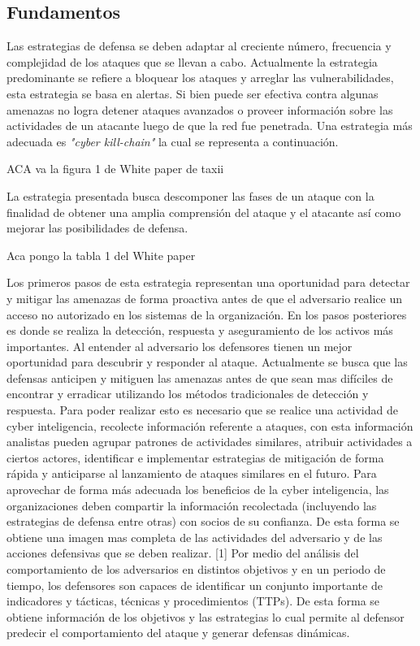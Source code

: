 \subsection{Fundamentos}
Las estrategias de defensa se deben adaptar al creciente número, frecuencia y 
complejidad de los ataques que se llevan a cabo. Actualmente la estrategia 
predominante se refiere a bloquear los ataques y arreglar las vulnerabilidades, 
esta estrategia se basa en alertas. Si bien puede ser efectiva contra algunas 
amenazas no logra detener ataques avanzados o proveer información sobre las 
actividades de un atacante luego de que la red fue penetrada. Una estrategia más 
adecuada es \emph{"cyber kill-chain"} la cual se representa a continuación.

ACA va la figura 1 de White paper de taxii

La estrategia presentada busca descomponer las fases de un ataque con la 
finalidad de obtener una amplia comprensión del ataque y el atacante así como 
mejorar las posibilidades de defensa.

Aca pongo la tabla 1 del White paper


Los primeros pasos de esta estrategia representan una oportunidad para detectar 
y mitigar las amenazas de forma proactiva antes de que el adversario realice un 
acceso no autorizado en los sistemas de la organización. En los pasos 
posteriores es donde se realiza la detección, respuesta y aseguramiento de los 
activos más importantes. Al entender al adversario los defensores tienen un 
mejor oportunidad para descubrir y responder al ataque. Actualmente se busca que 
las defensas anticipen y mitiguen las amenazas antes de que sean mas difíciles 
de encontrar y erradicar utilizando los métodos tradicionales de detección y 
respuesta.
Para poder realizar esto es necesario que se realice una actividad de cyber inteligencia,
recolecte información referente a ataques, con esta información analistas pueden 
agrupar patrones de actividades similares, atribuir actividades a ciertos actores, 
identificar e implementar estrategias de mitigación de forma rápida y anticiparse al 
lanzamiento de ataques similares en el futuro.
Para aprovechar de forma más adecuada los beneficios de la cyber inteligencia, 
las organizaciones deben compartir la información recolectada (incluyendo las 
estrategias de defensa entre otras) con socios de su confianza. De esta forma se 
obtiene una imagen mas completa de las actividades del adversario y de las 
acciones defensivas que se deben realizar. [1] Por medio del análisis del 
comportamiento de los adversarios en distintos objetivos y en un periodo de 
tiempo, los defensores son capaces de identificar un conjunto importante de 
indicadores y tácticas, técnicas y procedimientos (TTPs). De esta forma se 
obtiene información de los objetivos y las estrategias lo cual permite al 
defensor predecir el comportamiento del ataque y generar defensas dinámicas.
